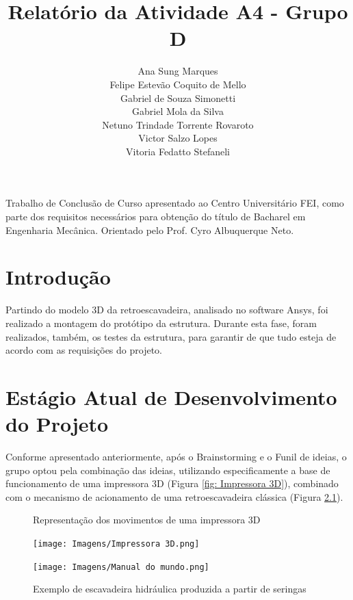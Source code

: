 \documentclass[deposito, acronym, symbols]{fei}
\title{Relatório da Atividade A4 - Grupo D}
\author{Ana Sung Marques \\Felipe Estevão Coquito de Mello\\  Gabriel de Souza Simonetti  \\ Gabriel Mola da Silva \\ Netuno Trindade Torrente Rovaroto \\ Victor Salzo Lopes  \\ Vitoria Fedatto Stefaneli}
\begin{document}
\maketitle

\begin{folhaderosto}
	Trabalho de Conclusão de Curso apresentado ao Centro Universitário FEI, como parte dos requisitos necessários para obtenção do título de Bacharel em Engenharia Mecânica. Orientado pelo Prof. Cyro Albuquerque Neto.
\end{folhaderosto}

\listoffigures


\chapter{Introdução}

Partindo do modelo 3D da retroescavadeira, analisado no software Ansys, foi realizado a montagem do protótipo da estrutura. Durante esta fase, foram realizados, também, os testes da estrutura, para garantir de que tudo esteja de acordo com as requisições do projeto.

\chapter{Estágio Atual de Desenvolvimento do Projeto}

Conforme apresentado anteriormente, após o Brainstorming e o Funil de ideias, o grupo optou pela combinação das ideias, utilizando especificamente a base de funcionamento de uma impressora 3D (Figura \ref{fig: Impressora 3D}), combinado com o mecanismo de acionamento de uma retroescavadeira clássica (Figura \ref{fig: Escavadeira Manal do Mundo}).

\begin{figure}[!htp]
  \centering
  \begin{minipage}{0.4\textwidth}
        \caption{Representação dos movimentos de uma impressora 3D}
        \texttt{[image: Imagens/Impressora 3D.png]}
        \label{fig: Impressora 3D}
  \end{minipage}
  \hfill
  \begin{minipage}{0.4\textwidth}
        \caption{Exemplo de escavadeira hidráulica produzida a partir de seringas}
        \texttt{[image: Imagens/Manual do mundo.png]}
        \label{fig: Escavadeira Manal do Mundo}
  \end{minipage}
\end{figure}
\end{document}
